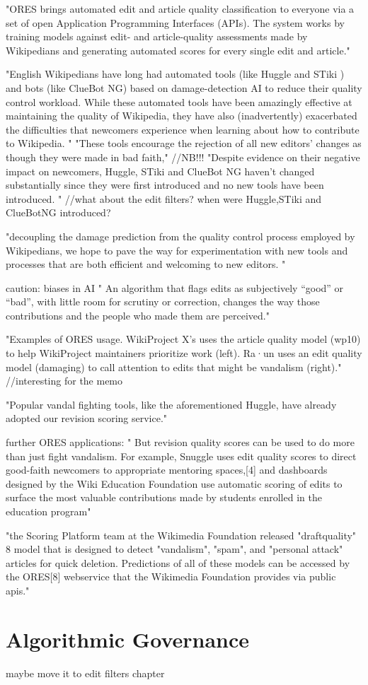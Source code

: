 "ORES brings automated edit and article quality classification to everyone via a set of open Application Programming Interfaces (APIs). The system works by training models against edit- and article-quality assessments made by Wikipedians and generating automated scores for every single edit and article."

"English Wikipedians have long had automated tools (like Huggle and STiki ) and bots (like ClueBot NG) based on damage-detection AI to reduce their quality control workload.  While these automated tools have been amazingly effective at maintaining the quality of Wikipedia, they have also (inadvertently) exacerbated the difficulties that newcomers experience when learning about how to contribute to Wikipedia. "
"These tools encourage the rejection of all new editors’ changes as though they were made in bad faith," //NB!!!
"Despite evidence on their negative impact on newcomers, Huggle, STiki and ClueBot NG haven’t changed substantially since they were first introduced and no new tools have been introduced. " //what about the edit filters? when were Huggle,STiki and ClueBotNG introduced?

"decoupling the damage prediction from the quality control process employed by Wikipedians, we hope to pave the way for experimentation with new tools and processes that are both efficient and welcoming to new editors. "

caution: biases in AI
" An algorithm that flags edits as subjectively “good” or “bad”, with little room for scrutiny or correction, changes the way those contributions and the people who made them are perceived."

"Examples of ORES usage. WikiProject X’s uses the article quality model (wp10) to help WikiProject maintainers prioritize work (left). Ra·un uses an edit quality model (damaging) to call attention to edits that might be vandalism (right)." //interesting for the memo

"Popular vandal fighting tools, like the aforementioned Huggle, have already adopted our revision scoring service."

further ORES applications:
"  But revision quality scores can be used to do more than just fight vandalism. For example, Snuggle uses edit quality scores to direct good-faith newcomers to appropriate mentoring spaces,[4] and dashboards designed by the Wiki Education Foundation use automatic scoring of edits to surface the most valuable contributions made by students enrolled in the education program"


\cite{AstHal2018}
"the Scoring Platform team at the Wikimedia Foundation
released "draftquality" 8 model that is designed to detect "vandalism", "spam", and "personal attack"
articles for quick deletion. Predictions of all of these models can be accessed by the ORES[8]
webservice that the Wikimedia Foundation provides via public apis."
\section{Algorithmic Governance}

maybe move it to edit filters chapter
